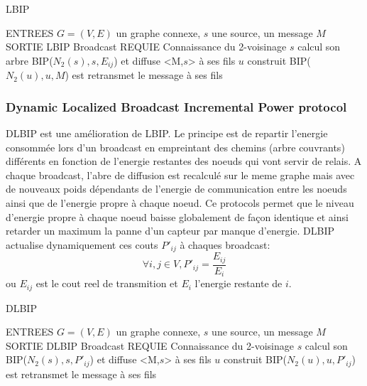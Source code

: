 \begin{algorithm}[H]
\caption{LBIP}
\label{algo_LBIP}
\begin{algorithmic}
\STATE ENTREES  $G=(V,E)$ un graphe connexe, $s$ une source, un message $M$
\STATE SORTIE  LBIP Broadcast
\STATE REQUIE  Connaissance du 2-voisinage
\STATE $s$ calcul son arbre BIP($N_2(s),s,E_{ij}$) et diffuse <M,$s$> à ses fils
		\STATE $u$ construit BIP($N_2(u),u,M$) est retransmet le message à ses fils
	\ENDIF
\ENDIF
\end{algorithmic}
\end{algorithm}



\subsubsection{Dynamic Localized Broadcast Incremental Power protocol \cite{Champ2009DLBIP}}
DLBIP est une amélioration de LBIP. Le principe est de repartir l'energie consommée lors d'un broadcast en empreintant des chemins (arbre couvrants) différents en fonction de l'energie restantes des noeuds qui vont servir de relais.
A chaque broadcast, l'abre de diffusion est recalculé sur le meme graphe mais avec de nouveaux poids dépendants de l'energie de communication entre les noeuds ainsi que de l'energie propre à chaque noeud. Ce protocols permet que
le niveau d'energie propre à chaque noeud baisse globalement de façon identique et ainsi retarder un maximum la panne d'un capteur par manque d'energie.
DLBIP actualise dynamiquement ces couts $P'_{ij}$ à chaques broadcast:
$$ \forall i,j \in V, P'_{ij}=\frac{E_{ij}}{E_i}$$
ou $E_{ij}$ est le cout reel de transmition et $E_i$ l'energie restante de $i$.


\begin{algorithm}[h]
\caption{DLBIP}
\label{algo_DLBIP}
\begin{algorithmic}
\STATE ENTREES  $G=(V,E)$ un graphe connexe, $s$ une source, un message $M$
\STATE SORTIE  DLBIP Broadcast
\STATE REQUIE  Connaissance du 2-voisinage
\STATE $s$ calcul son BIP($N_2(s),s,P'_{ij}$) et diffuse <M,$s$> à ses fils
		\STATE $u$ construit BIP($N_2(u),u,P'_{ij}$) est retransmet le message à ses fils
	\ENDIF
\ENDIF
\end{algorithmic}
\end{algorithm}



